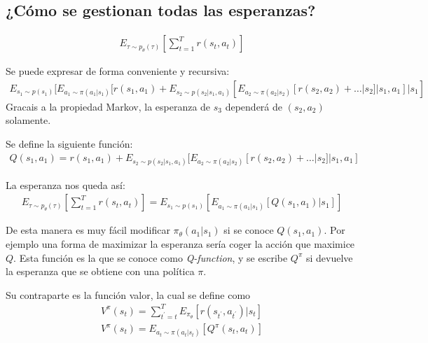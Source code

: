 \subsection{¿Cómo se gestionan todas las esperanzas?}%
\label{sub:_cómo_se_gestionan_todas_las_esperanzas_}

\begin{align}
    E _ { \tau \sim p _ { \theta } ( \tau ) } \left[ \sum _ { t = 1 } ^ { T } r ( s _ { t } , a _
        { t } ) \right]
\end{align}

Se puede expresar de forma conveniente y recursiva:
\begin{align}
    E _ { s _ { 1 } \sim p ( s _ { 1 } ) } [ E _ { a _ { 1 } \sim \pi ( a _ { 1 } | s _ { 1 } ) } [ r ( s _ { 1 } , a _ { 1 } ) + E _ { s _ { 2 } \sim p ( s _ { 2 } | s _ { 1 } , a _ { 1 } ) } [ E _ { a _ { 2 } \sim \pi ( a _ { 2 } | s _ { 2 } ) } [ r ( s _ { 2 } , a _ { 2 } ) + \ldots | s _ { 2 } ] | s _ { 1 } , a _ { 1 } ] | s _ { 1 } ]
\end{align}
Gracais a la propiedad Markov, la esperanza de $s_3$ dependerá de $(s_2, a_2)$ solamente.

Se define la siguiente función:
\begin{align}
Q ( s _ { 1 } , a _ { 1 } ) = r ( s _ { 1 } , a _ { 1 } ) + E _ { s _ { 2 } \sim p ( s _ { 2 } | s _ { 1 } , a _ { 1 } ) } [ E _ { a _ { 2 } \sim \pi ( a _ { 2 } | s _ { 2 } ) } [ r ( s _ { 2 } , a _ { 2 } ) + \ldots | s _ { 2 } ] | s _ { 1 } , a _ { 1 } ]
\end{align}

La esperanza nos queda así:
\begin{align}
E _ { \tau \sim p _ { \theta } ( \tau ) } [ \sum _ { t = 1 } ^ { T } r ( s _ { t } , a _ { t } ) ] = E _ { s _ { 1 } \sim p ( s _ { 1 } ) } [ E _ { a _ { 1 } \sim \pi ( a _ { 1 } | s _ { 1 } ) } [ Q ( s _ { 1 } , a _ { 1 } ) | s _ { 1 } ] ]
\end{align}

De esta manera es muy fácil modificar $\pi_\theta(a_1|s_1)$ si se conoce $Q(s_1,a_1)$. Por
ejemplo una forma de maximizar la esperanza sería coger la acción que maximice $Q$. Esta
función es la que se conoce como \textit{Q-function}, y se escribe $Q^\pi$ si devuelve la
esperanza que se obtiene con una política $\pi$.

Su contraparte es la función valor, la cual se define como
\begin{align}
V ^ { \pi } ( s _ { t } ) = \sum _ { t ^ { \prime } = t } ^ { T } E _ { \pi _ { \theta } } [ r (
s _ { t ^ { \prime } } , a _ { t ^ { \prime } } ) | s _ { t } ]\\
V ^ { \pi } ( s _ { t } ) = E _ { a _ { t } \sim \pi ( a _ { t } | s _ { t } ) } [ Q ^ { \pi } ( s _ { t } , a _ { t } ) ]
\end{align}

